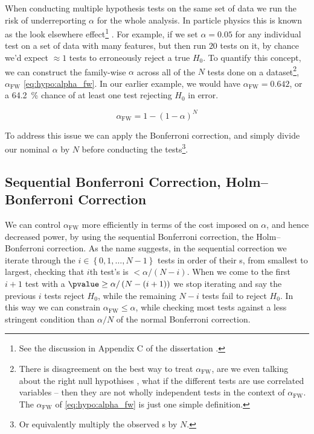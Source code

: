 When conducting multiple hypothesis tests on the same set of data
we run the risk of underreporting $\alpha$ for the whole analysis.
In particle physics this is known as the look elsewhere effect\footnote{See the discussion in Appendix C of the dissertation \cite{mepland_dissertation}.}
\cite{Demortier:2007zz,lyons2008,Gross2010,Ranucci:2012ed}.
For example, if we set $\alpha = \num{0.05}$ for any individual test
on a set of data with many features, but then run $\num{20}$
tests on it, by chance we'd expect $\approx \num{1}$ tests
to erroneously reject a true $H_{0}$.
To quantify this concept, we can construct
the family-wise $\alpha$ across all of the $N$ tests done on a dataset\footnote{There is
disagreement on the best way to treat $\alpha_{\text{FW}}$,
\eg are we even talking about the right null hypothises \cite{Perneger1236},
what if the different tests are use correlated variables -- then they are not wholly independent tests in the context of $\alpha_{\text{FW}}$.
The $\alpha_{\text{FW}}$ of \cref{eq:hypo:alpha_fw} is just one simple definition.},
$\alpha_{\text{FW}}$ \cref{eq:hypo:alpha_fw}.
In our earlier example, we would have $\alpha_{\text{FW}} = \num{0.642}$,
or a \SI{64.2}{\percent} chance of at least one test rejecting $H_{0}$ in error.

\begin{equation}\label{eq:hypo:alpha_fw}
\alpha_{\text{FW}} = 1 - \left(1 - \alpha\right)^{N}
\end{equation}

To address this issue we can apply the Bonferroni correction,
and simply divide our nominal $\alpha$ by $N$
before conducting the tests\footnote{Or equivalently multiply the observed {\pvalue}s by $N$.}.

\subsection{Sequential Bonferroni Correction, \ie Holm--Bonferroni Correction}
\label{hypo:bonferroni_correction:sequential}

We can control $\alpha_{\text{FW}}$ more efficiently in terms of the cost imposed on $\alpha$, and hence decreased power,
by using the sequential Bonferroni correction, \ie the Holm--Bonferroni correction.
As the name suggests, in the sequential correction
we iterate through the $i \in \left\{0, 1, \ldots, N-1\right\}$ tests
in order of their {\pvalue}s, from smallest to largest,
checking that $i$th test's \pvalue is $< \alpha / \left(N-i\right)$.
When we come to the first $i+1$ test with a $\pvalue \geq \alpha / \left(N-\left(i+1\right)\right)$
we stop iterating and say the previous $i$ tests reject $H_{0}$,
while the remaining $N-i$ tests fail to reject $H_{0}$.
In this way we can constrain $\alpha_{\text{FW}} \leq \alpha$,
while checking most tests against a less stringent condition
than $\alpha / N$ of the normal Bonferroni correction.
